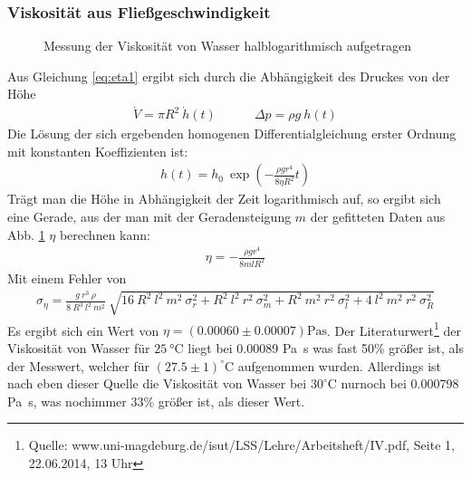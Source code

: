 \documentclass[12pt,a4paper,titlepage,headinclude,bibtotoc]{scrartcl}
\begin{document}
\subsubsection{Viskosität aus Fließgeschwindigkeit}
\begin{figure}
\centering

\caption{Messung der Viskosität von Wasser halblogarithmisch aufgetragen\label{fig:viskogerade}}
\end{figure}
Aus Gleichung \ref{eq:eta1} ergibt sich durch die Abhängigkeit des Druckes von der Höhe
\begin{align*}
\dot V=\pi R^2~\dot h(t) \qquad \quad
\Delta p=\rho g~h(t)
\end{align*}
Die Lösung der sich ergebenden homogenen Differentialgleichung erster Ordnung mit konstanten Koeffizienten ist:
\begin{align}
 h(t)=h_0~ \exp\left(-\frac{\rho g r^4}{8\eta R^2}t\right)
\end{align}
Trägt man die Höhe in Abhängigkeit der Zeit logarithmisch auf, so ergibt sich eine Gerade, aus der man mit der Geradensteigung $m$ der gefitteten Daten aus Abb. \ref{fig:viskogerade} $\eta$ berechnen kann:
\begin{align}
 \eta=-\frac{\rho g r^4}{8mlR^2}
\end{align}
Mit einem Fehler von
\begin{align*}
	\sigma_{\eta}=\frac{g ~ r^{3} ~ \rho}{8 ~ R^{3} ~ l^{2} ~ m^{2}} ~ \sqrt{16 ~ R^{2} ~ l^{2} ~ m^{2} ~ \sigma_{r}^{2} + R^{2} ~ l^{2} ~ r^{2} ~ \sigma_{m}^{2} + R^{2} ~ m^{2} ~ r^{2} ~ \sigma_{l}^{2} + 4 ~ l^{2} ~ m^{2} ~ r^{2} ~ \sigma_{R}^{2}}
\end{align*}
Es ergibt sich ein Wert von $\eta=(0.00060 \pm 0.00007)\si{\Pa\s}$.
Der Literaturwert\footnote{Quelle: www.uni-magdeburg.de/isut/LSS/Lehre/Arbeitsheft/IV.pdf, Seite 1, 22.06.2014, 13 Uhr} der Viskosität von Wasser für $\SI{25}{\celsius}$ liegt bei 0.00089 \si{\Pa\s} was fast 50\% größer ist, als der Messwert, welcher für $(27.5\pm 1)^\circ$C aufgenommen wurden. Allerdings ist nach eben dieser Quelle die Viskosität von Wasser bei $30^\circ$C nurnoch bei 0.000798 \si{\Pa\s}, was nochimmer 33\% größer ist, als dieser Wert.
\end{document}
